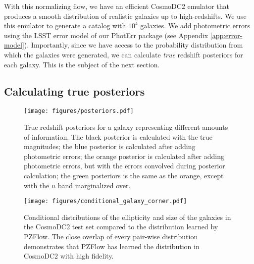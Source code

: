 \documentclass[twocolumn,twocolappendix]{aastex631}
\begin{document}
With this normalizing flow, we have an efficient CosmoDC2 emulator that produces a smooth distribution of realistic galaxies up to high-redshifts.
We use this emulator to generate a catalog with $10^4$ galaxies.
We add photometric errors using the LSST error model of our PhotErr package (see Appendix \ref{app:error-model}).
Importantly, since we have access to the probability distribution from which the galaxies were generated, we can calculate \emph{true} redshift posteriors for each galaxy.
This is the subject of the next section.

\subsection{Calculating true posteriors}
\label{sec:true-posteriors}

\begin{figure}[t]
    \begin{centering}
        \texttt{[image: figures/posteriors.pdf]}
        \caption{
            True redshift posteriors for a galaxy representing different amounts of information.
            The black posterior is calculated with the true magnitudes;
            the blue posterior is calculated after adding photometric errors;
            the orange posterior is calculated after adding photometric errors, but with the errors convolved during posterior calculation;
            the green posteriors is the same as the orange, except with the $u$ band marginalized over.
        }
        \label{fig:posteriors}
    \end{centering}
\end{figure}

\begin{figure*}[t]
    \begin{centering}
        \texttt{[image: figures/conditional\_galaxy\_corner.pdf]}
        \caption{
            Conditional distributions of the ellipticity and size of the galaxies in the CosmoDC2 test set compared to the distribution learned by PZFlow.
            The close overlap of every pair-wise distribution demonstrates that PZFlow has learned the distribution in CosmoDC2 with high fidelity.
        }
        \label{fig:conditional-corner}
    \end{centering}
\end{figure*}
\end{document}
